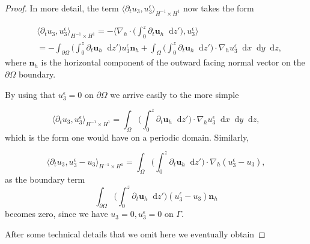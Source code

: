 \documentclass[12pt]{report}
\numberwithin{theorem}{chapter}
\numberwithin{corollary}{chapter}
\numberwithin{lemma}{chapter}
\numberwithin{remark}{chapter}
\numberwithin{definition}{chapter}
\numberwithin{prop}{chapter}
\newcommand*\diff{\mathop{}\!\mathrm{d}}
\begin{document}
\begin{proof}
In more detail, the term $ \langle \partial_t u_3, u_3^\epsilon \rangle _{H^{-1} \times H^1}$ now takes the form 

\begin{equation}
  \begin{split}
    & \langle \partial_t u_3, u_3^\epsilon \rangle _{H^{-1} \times H^1} = - \bigg \langle \nabla_h \cdot \bigg ( \int_0^z \partial_t \mathbf{u}_h \diff z' \bigg ) , u_3^\epsilon \bigg \rangle \\
    & = - \int_{\partial \Omega} \bigg ( \int_0^z \partial_t \mathbf{u}_h \diff z' \bigg ) u_3^\epsilon \mathbf{n}_h + \int_\Omega \bigg ( \int_0^z \partial_t \mathbf{u}_h \diff z' \bigg) \cdot \nabla_h u_3^\epsilon \diff x \diff y \diff z,
  \end{split}
\end{equation}
%
where $\mathbf{n}_h$ is the horizontal component of the outward facing normal vector on the $\partial \Omega$ boundary.
    
By using that $u_3^\epsilon = 0$ on $\partial \Omega$ we arrive easily to the more simple
    
$$ \langle \partial_t u_3, u_3^\epsilon \rangle _{H^{-1} \times H^1} = \int_\Omega \bigg ( \int_0^z \partial_t \mathbf{u}_h \diff z' \bigg) \cdot \nabla_h u_3^\epsilon \diff x \diff y \diff z,$$
%
which is the form one would have on a periodic domain. Similarly, 
     
$$ \langle \partial_t u_3, u_3^\epsilon - u_3 \rangle _{H^{-1} \times H^1} = \int_\Omega \bigg ( \int_0^z \partial_t \mathbf{u}_h \diff z' \bigg) \cdot \nabla_h (u_3^\epsilon - u_3),$$ as the boundary term $$\int_{\partial \Omega} \bigg ( \int_0^z \partial_t \mathbf{u}_h \diff z' \bigg ) (u_3^\epsilon - u_3) \mathbf{n}_h$$ becomes zero, since we have $u_3 = 0, u_3^\epsilon = 0$ on $\Gamma.$ 

After some technical details that we omit here we eventually obtain


\end{proof}
\end{document}
